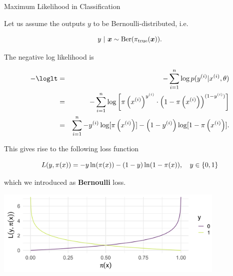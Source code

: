 \begin{vbframe}{Maximum Likelihood in Classification}

Let us assume the outputs $y$ to be Bernoulli-distributed, i.e.  

$$
  y ~|~ \bm{x} \sim \text{Ber}(\pi_\text{true}(\bm{x})). 
$$

The negative log likelihood is

\begin{eqnarray*}
- \loglt &=& -\sumin \lpdfyigxit \\ 
&=& - \sumin \log \left[\pi\left(\xi\right)^{y^{(i)}} \cdot \left(1 - \pi\left(\xi\right)\right)^{(1 - y^{(i)})} \right]\\
&=& \sumin -\yi \log[\pi\left(\xi\right)] - \left(1-\yi\right) \log [1 - \pi\left(\xi\right)]. 
\end{eqnarray*}


\framebreak 

This gives rise to the following loss function 

$$
  L(y, \pi(x)) = -y\ln(\pi(x))-(1-y)\ln(1-\pi(x)), \quad y \in \{0, 1\}
$$

which we introduced as \textbf{Bernoulli} loss. 

\vspace{0.2cm}

\begin{center}
\includegraphics[width = 11cm ]{figure_man/bernoulli-loss.png} \\
\end{center}








\end{vbframe}
